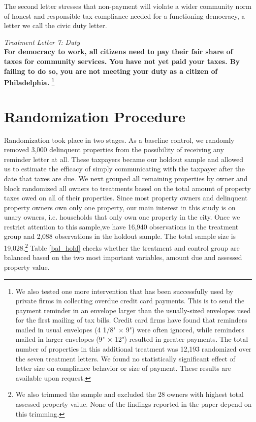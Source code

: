 \documentclass[12pt]{article}
\begin{document}
The second letter stresses that non-payment will violate a wider
community norm of honest and responsible tax compliance needed for a
functioning democracy, a letter we call the civic duty letter. 

{\it Treatment Letter 7: Duty } \\ {\bf For democracy to work, all
  citizens need to pay their fair share of taxes for community
  services. You have not yet paid your taxes. By failing to do so, you
  are not meeting your duty as a citizen of Philadelphia.}
\footnote{We also tested one more intervention that has been
  successfully used by private firms in collecting overdue credit card
  payments.  This is to send the payment reminder in an envelope
  larger than the usually-sized envelopes used for the first mailing
  of tax bills.  Credit card firms have found that reminders mailed in
  usual envelopes (4 1/8" $\times$ 9") were often ignored, while reminders
  mailed in larger envelopes (9" $\times$ 12") resulted in greater payments.
  The total number of properties in this additional treatment was
  12,193 randomized over the seven treatment letters.  We found no
  statistically significant effect of letter size on compliance
  behavior or size of payment.  These results are available upon
  request.}
  
\section{Randomization Procedure}

Randomization took place in two stages. 
As a baseline control, we randomly removed 3,000 delinquent properties
from the possibility of receiving any reminder letter at all.  These
taxpayers became our holdout sample and allowed us to estimate the
efficacy of simply communicating with the taxpayer after the date that
taxes are due. We next grouped all remaining properties by owner
and block randomized all owners to treatments based on the total
amount of property taxes owed on all of their properties. Since most
property owners and delinquent property owners own only one property,
our main interest in this study is on unary owners, i.e. households that only
own one property in the city. Once we restrict attention to this
sample,we have 16,940 observations in the treatment group and
2,088 observations in the holdout sample.  The total sample size is
19,028.\footnote{We also trimmed the sample and excluded the 28
  owners with highest total assessed property value. None of the
  findings reported in the paper depend on this trimming.}  Table
\ref{bal_hold} checks whether the treatment and control group are
balanced based on the two most important variables, amount due and
assessed property value.
\end{document}
